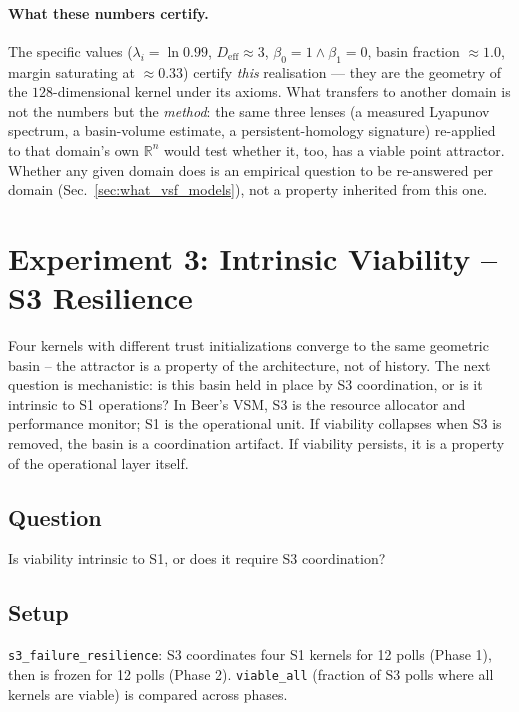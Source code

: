 \documentclass[11pt, a4paper]{article}
\newcommand{\R}{\mathbb{R}}
\begin{document}
\paragraph{What these numbers certify.} The specific values
($\lambda_i = \ln 0.99$, $D_\text{eff} \approx 3$, $\beta_0 = 1 \wedge
\beta_1 = 0$, basin fraction $\approx 1.0$, margin saturating at $\approx 0.33$)
certify \emph{this} realisation --- they are the geometry of the $128$-dimensional
kernel under its axioms. What transfers to another domain is not the numbers but
the \emph{method}: the same three lenses (a measured Lyapunov spectrum, a
basin-volume estimate, a persistent-homology signature) re-applied to that
domain's own $\R^n$ would test whether it, too, has a viable point attractor.
Whether any given domain does is an empirical question to be re-answered per
domain (Sec.~\ref{sec:what_vsf_models}), not a property inherited from this one.


\section{Experiment 3: Intrinsic Viability -- S3 Resilience}
\label{sec:resilience}

Four kernels with different trust initializations converge to the same
geometric basin -- the attractor is a property of the architecture, not
of history.
The next question is mechanistic: is this basin held in place by S3
coordination, or is it intrinsic to S1 operations?
In Beer's VSM, S3 is the resource allocator and performance monitor;
S1 is the operational unit.
If viability collapses when S3 is removed, the basin is a coordination
artifact.
If viability persists, it is a property of the operational layer itself.

\subsection*{Question} Is viability intrinsic to S1, or does it require
S3 coordination?

\subsection{Setup}

\texttt{s3\_failure\_resilience}: S3 coordinates four S1 kernels for 12 polls
(Phase 1), then is frozen for 12 polls (Phase 2).
\texttt{viable\_all} (fraction of S3 polls where all kernels are viable) is
compared across phases.
\end{document}
